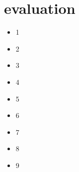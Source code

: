 \section{evaluation}
\begin{itemize}

\item 1

\item 2

\item 3

\item 4

\item 5

\item 6

\item 7

\item 8

\item 9
\end{itemize}
